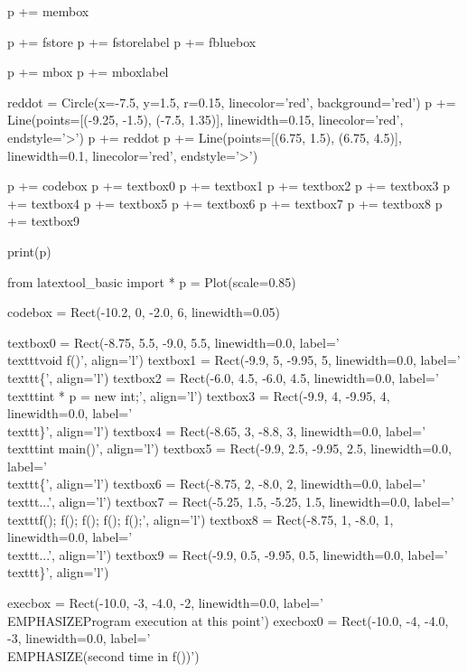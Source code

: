 \begin{python}
p += membox

p += fstore
p += fstorelabel
p += fbluebox

p += mbox
p += mboxlabel

reddot = Circle(x=-7.5, y=1.5, r=0.15, linecolor='red', background='red')
p += Line(points=[(-9.25, -1.5), (-7.5, 1.35)], linewidth=0.15, linecolor='red', endstyle='>')
p += reddot
p += Line(points=[(6.75, 1.5), (6.75, 4.5)], linewidth=0.1, linecolor='red', endstyle='>')

p += codebox
p += textbox0
p += textbox1
p += textbox2
p += textbox3
p += textbox4
p += textbox5
p += textbox6
p += textbox7
p += textbox8
p += textbox9

print(p)
\end{python}


\begin{python}
from latextool_basic import *
p = Plot(scale=0.85)

codebox = Rect(-10.2, 0, -2.0, 6, linewidth=0.05)

textbox0 = Rect(-8.75, 5.5, -9.0, 5.5, linewidth=0.0, label='\\texttt{void f()}', align='l')
textbox1 = Rect(-9.9, 5, -9.95, 5, linewidth=0.0, label='\\texttt{\{}', align='l')
textbox2 = Rect(-6.0, 4.5, -6.0, 4.5, linewidth=0.0, label='\\texttt{int * p = new int;}', align='l')
textbox3 = Rect(-9.9, 4, -9.95, 4, linewidth=0.0, label='\\texttt{\}}', align='l')
textbox4 = Rect(-8.65, 3, -8.8, 3, linewidth=0.0, label='\\texttt{int main()}', align='l')
textbox5 = Rect(-9.9, 2.5, -9.95, 2.5, linewidth=0.0, label='\\texttt{\{}', align='l')
textbox6 = Rect(-8.75, 2, -8.0, 2, linewidth=0.0, label='\\texttt{...}', align='l')
textbox7 = Rect(-5.25, 1.5, -5.25, 1.5, linewidth=0.0, label='\\texttt{f(); f(); f(); f(); f();}', align='l')
textbox8 = Rect(-8.75, 1, -8.0, 1, linewidth=0.0, label='\\texttt{...}', align='l')
textbox9 = Rect(-9.9, 0.5, -9.95, 0.5, linewidth=0.0, label='\\texttt{\}}', align='l')

execbox = Rect(-10.0, -3, -4.0, -2, linewidth=0.0,
               label='\\EMPHASIZE{Program execution at this point}')
execbox0 = Rect(-10.0, -4, -4.0, -3, linewidth=0.0,
               label='\\EMPHASIZE{(second time in f())}')


\end{python}
